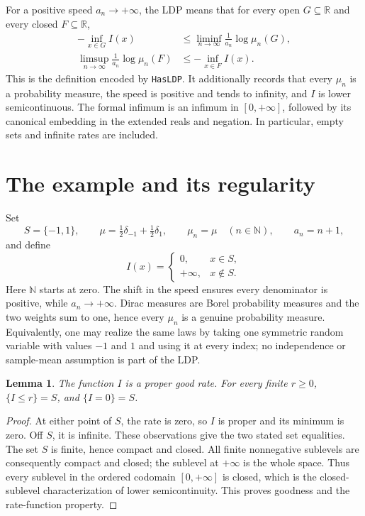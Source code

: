 \documentclass[11pt]{article}
\newtheorem{lemma}[theorem]{Lemma}
\newcommand{\R}{\mathbb R}
\newcommand{\N}{\mathbb N}
\begin{document}
For a positive speed $a_n\to+\infty$, the LDP means that for every open
$G\subseteq\R$ and every closed $F\subseteq\R$,
\begin{align}\label{eq:lower}
 -\inf_{x\in G}I(x)&\le
 \liminf_{n\to\infty}\frac{1}{a_n}\log\mu_n(G),\\
 \limsup_{n\to\infty}\frac{1}{a_n}\log\mu_n(F)&\le
 -\inf_{x\in F}I(x).\label{eq:upper}
\end{align}
This is the definition encoded by \texttt{HasLDP}. It additionally records
that every $\mu_n$ is a probability measure, the speed is positive and tends
to infinity, and $I$ is lower semicontinuous. The formal infimum is an infimum
in $[0,+\infty]$, followed by its canonical embedding in the extended reals
and negation. In particular, empty sets and infinite rates are included.

\section{The example and its regularity}

Set
\[
 S=\{-1,1\},\qquad
 \mu=\tfrac12\delta_{-1}+\tfrac12\delta_1,\qquad
 \mu_n=\mu\quad(n\in\N),\qquad a_n=n+1,
\]
and define
\[
 I(x)=\begin{cases}0,&x\in S,\\+\infty,&x\notin S.\end{cases}
\]
Here $\N$ starts at zero. The shift in the speed ensures every denominator
is positive, while $a_n\to+\infty$. Dirac measures are Borel probability
measures and the two weights sum to one, hence every $\mu_n$ is a genuine
probability measure. Equivalently, one may realize the same laws by taking
one symmetric random variable with values $-1$ and $1$ and using it at
every index; no independence or sample-mean assumption is part of the LDP.

\begin{lemma}\label{lem:regularity}
The function $I$ is a proper good rate. For every finite $r\ge0$,
$\{I\le r\}=S$, and $\{I=0\}=S$.
\end{lemma}
\begin{proof}
At either point of $S$, the rate is zero, so $I$ is proper and its minimum
is zero. Off $S$, it is infinite. These observations give the two stated set
equalities. The set $S$ is finite, hence compact and closed. All finite
nonnegative sublevels are consequently compact and closed; the sublevel at
$+\infty$ is the whole space. Thus every sublevel in the ordered codomain
$[0,+\infty]$ is closed, which is the closed-sublevel characterization of
lower semicontinuity. This proves goodness and the rate-function property.
\end{proof}
\end{document}
